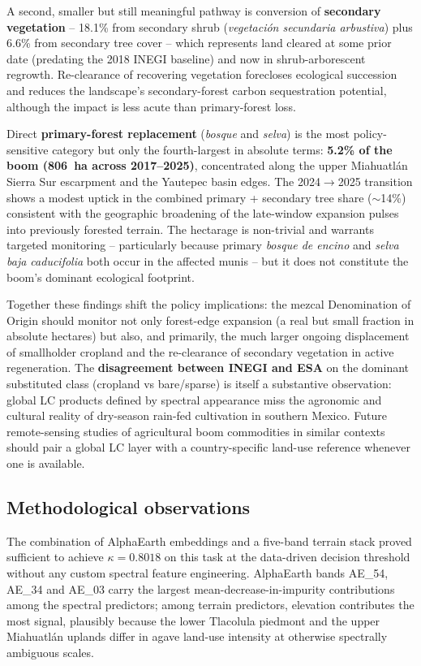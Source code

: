 \documentclass[10pt,a4paper]{article}
\begin{document}
A second, smaller but still meaningful pathway is conversion of
\textbf{secondary vegetation} -- 18.1\% from secondary shrub
(\textit{vegetaci\'on secundaria arbustiva}) plus 6.6\% from
secondary tree cover -- which represents land cleared at some
prior date (predating the 2018 INEGI baseline) and now in
shrub-arborescent regrowth. Re-clearance of recovering
vegetation forecloses ecological succession and reduces the
landscape's secondary-forest carbon sequestration potential,
although the impact is less acute than primary-forest loss.

Direct \textbf{primary-forest replacement} (\textit{bosque} and
\textit{selva}) is the most policy-sensitive category but only
the fourth-largest in absolute terms: \textbf{5.2\% of the boom
(806~ha across 2017--2025)}, concentrated along the upper
Miahuatlán Sierra Sur escarpment and the Yautepec basin edges.
The 2024$\to$2025 transition shows a modest uptick in the
combined primary + secondary tree share ($\sim$14\%) consistent
with the geographic broadening of the late-window expansion
pulses into previously forested terrain. The hectarage is
non-trivial and warrants targeted monitoring -- particularly
because primary \textit{bosque de encino} and \textit{selva baja
caducifolia} both occur in the affected munis -- but it does not
constitute the boom's dominant ecological footprint.

Together these findings shift the policy implications: the
mezcal Denomination of Origin should monitor not only
forest-edge expansion (a real but small fraction in absolute
hectares) but also, and primarily, the much larger ongoing
displacement of smallholder cropland and the re-clearance of
secondary vegetation in active regeneration. The
\textbf{disagreement between INEGI and ESA} on the dominant
substituted class (cropland vs bare/sparse) is itself a
substantive observation: global LC products defined by spectral
appearance miss the agronomic and cultural reality of dry-season
rain-fed cultivation in southern Mexico. Future remote-sensing
studies of agricultural boom commodities in similar contexts
should pair a global LC layer with a country-specific land-use
reference whenever one is available.

\subsection{Methodological observations}

The combination of AlphaEarth embeddings and a five-band terrain stack
proved sufficient to achieve $\kappa = 0.8018$ on this task at the
data-driven decision threshold without any custom spectral feature
engineering. AlphaEarth bands AE\_54, AE\_34 and AE\_03 carry the
largest mean-decrease-in-impurity contributions among the spectral
predictors; among terrain predictors, elevation contributes the most
signal, plausibly because the lower Tlacolula piedmont and the
upper Miahuatlán uplands differ in agave land-use intensity at
otherwise spectrally ambiguous scales.
\end{document}
